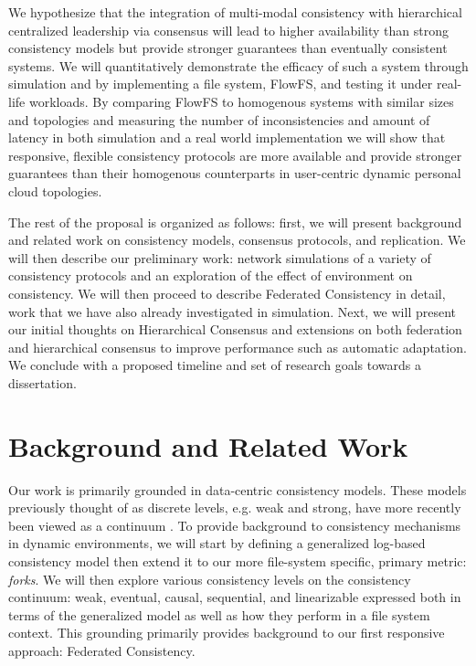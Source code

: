 \documentclass{article}
\begin{document}
We hypothesize that the integration of multi-modal consistency with hierarchical centralized leadership via consensus will lead to higher availability than strong consistency models but provide stronger guarantees than eventually consistent systems. We will quantitatively demonstrate the efficacy of such a system through simulation and by implementing a file system, FlowFS, and testing it under real-life workloads. By comparing FlowFS to homogenous systems with similar sizes and topologies and measuring the number of inconsistencies and amount of latency in both simulation and a real world implementation we will show that responsive, flexible consistency protocols are more available and provide stronger guarantees than their homogenous counterparts in user-centric dynamic personal cloud topologies.

The rest of the proposal is organized as follows: first, we will present background and related work on consistency models, consensus protocols, and replication. We will then describe our preliminary work: network simulations of a variety of consistency protocols and an exploration of the effect of environment on consistency. We will then proceed to describe Federated Consistency in detail, work that we have also already investigated in simulation. Next, we will present our initial thoughts on Hierarchical Consensus and extensions on both federation and hierarchical consensus to improve performance such as automatic adaptation. We conclude with a proposed timeline and set of research goals towards a dissertation.

\section{Background and Related Work}

Our work is primarily grounded in data-centric consistency models. These models previously thought of as discrete levels, e.g. weak and strong, have more recently been viewed as a continuum \cite{yu_design_2002,afek_quasi-linearizability:_2010}. To provide background to consistency mechanisms in dynamic environments, we will start by defining a generalized log-based consistency model then extend it to our more file-system specific, primary metric: \textit{forks}. We will then explore various consistency levels on the consistency continuum: weak, eventual, causal, sequential, and linearizable expressed both in terms of the generalized model as well as how they perform in a file system context. This grounding primarily provides background to our first responsive approach: Federated Consistency.
\end{document}
